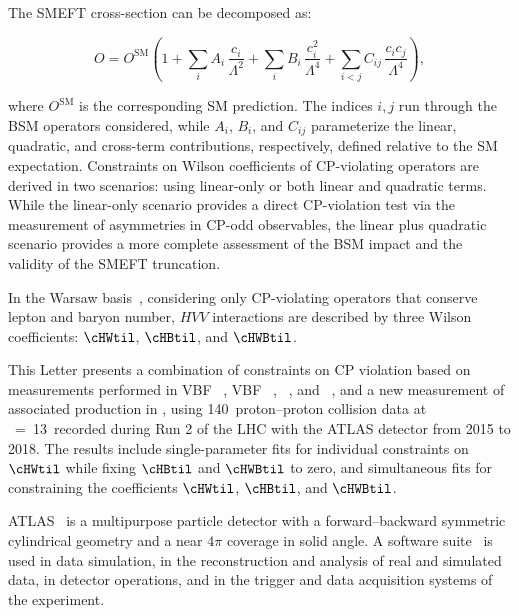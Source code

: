 \documentclass[PAPER, atlasdraft=false, cernpreprint,UKenglish, texmf, orcidlogo]{atlasdoc}
\begin{document}
The SMEFT cross-section can be decomposed as:























\begin{equation}
O = O^{\mathrm{SM}}
\left(
1
+ \sum_i A_{i}\, \frac{c_i}{\Lambda^2}
+ \sum_i B_{i}\, \frac{c_i^2}{\Lambda^4}
+ \sum_{i<j} C_{i j}\, \frac{c_i c_j}{\Lambda^4}
\right),

\end{equation}

where $O^{\mathrm{SM}}$ is the corresponding SM prediction. The indices $i,j$ run through the BSM operators considered, while $A_{i}$, $B_{i}$, and $C_{i j}$ parameterize the linear, quadratic, and cross-term contributions, respectively, defined relative to the SM expectation.
Constraints on Wilson coefficients of CP-violating operators are derived in two scenarios: using linear-only or both linear and quadratic terms.
While the linear-only scenario provides a direct CP-violation test via the measurement of asymmetries in CP-odd observables, the linear plus quadratic scenario provides a more complete assessment of the BSM impact and the validity of the SMEFT truncation.

In the Warsaw basis~\cite{Warsaw}, considering only CP-violating operators that conserve lepton and baryon number, $HVV$ interactions are described by three Wilson coefficients: $\cHWtil$, $\cHBtil$, and $\cHWBtil$.

This Letter presents a combination of constraints on CP violation based on measurements performed in VBF \HGam~\cite{HIGG-2020-08},  VBF \Htautau~\cite{HIGP-2024-09}, \HWW~\cite{HIGP-2024-07}, and \HZZ~\cite{HIGG-2018-30}, and a new measurement of associated production in \WHbb, using 140~\ifb proton--proton collision data at \sqs~=~13~\TeV recorded during Run 2 of the LHC with the ATLAS detector from 2015 to 2018. The results include single-parameter fits for individual constraints on $\cHWtil$ while fixing $\cHBtil$ and $\cHWBtil$ to zero, and simultaneous fits for constraining the coefficients $\cHWtil$, $\cHBtil$, and $\cHWBtil$.

ATLAS~\cite{PERF-2007-01,GENR-2019-02} is a multipurpose particle detector with a forward--backward symmetric cylindrical geometry and a near \(4\pi\) coverage in solid angle. A software suite~\cite{SOFT-2022-02} is used in data simulation, in the reconstruction and analysis of real and simulated data, in detector operations, and in the trigger and data acquisition systems of the experiment.
\end{document}
